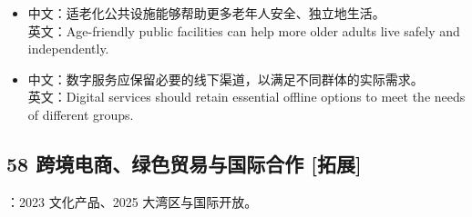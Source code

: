 \documentclass[a4paper,11pt,UTF8,fontset=none]{ctexart}
\begin{document}
\begin{itemize}[leftmargin=1.7em,itemsep=1pt,parsep=0pt,topsep=2pt]
\item \noindent 中文：适老化公共设施能够帮助更多老年人安全、独立地生活。\\ 英文：Age-friendly public facilities can help more older adults live safely and independently.\par


\item \noindent 中文：数字服务应保留必要的线下渠道，以满足不同群体的实际需求。\\ 英文：Digital services should retain essential offline options to meet the needs of different groups.\par


\end{itemize}

\subsection{58 跨境电商、绿色贸易与国际合作 {\color{AccentBlue} [拓展]}}

\begin{tcolorbox}[enhanced,breakable,boxrule=0.35pt,colback=VeryPaleBlue,colframe=AccentBlue!40,left=7pt,right=7pt,top=4pt,bottom=4pt,borderline west={2pt}{0pt}{AccentBlue},before skip=4pt,after skip=6pt]
：2023 文化产品、2025 大湾区与国际开放。\par


\end{tcolorbox}
\end{document}
